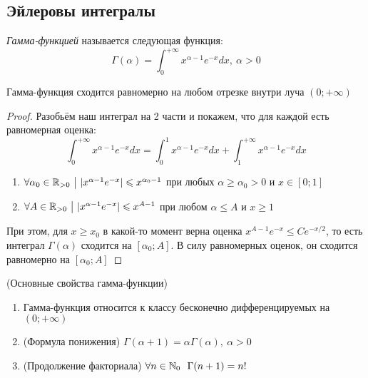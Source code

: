 \subsection{Эйлеровы интегралы}

\begin{definition}
	\textit{Гамма-функцией} называется следующая функция:
	\[
		\Gamma(\alpha) = \int_0^{+\infty} x^{\alpha - 1}e^{-x}dx,\ \alpha > 0
	\]
\end{definition}

\begin{proposition}
	Гамма-функция сходится равномерно на любом отрезке внутри луча $(0; +\infty)$
\end{proposition}

\begin{proof}
	Разобьём наш интеграл на 2 части и покажем, что для каждой есть равномерная оценка:
	\[
		\int_0^{+\infty} x^{\alpha - 1}e^{-x}dx = \int_0^1 x^{\alpha - 1}e^{-x}dx + \int_1^{+\infty} x^{\alpha - 1}e^{-x}dx
	\]
	\begin{enumerate}
		\item $\forall \alpha_0 \in \mathbb{R}_{> 0} \ \big|\  |x^{\alpha - 1}e^{-x}| \leqslant x^{\alpha_0 - 1}$ при любых $\alpha \ge \alpha_0 > 0$ и $x \in [0; 1]$
		
		\item $\forall A \in \mathbb{R}_{> 0} \ \big|\  |x^{\alpha - 1}e^{-x}| \leqslant x^{A - 1}$ при любом $\alpha \le A$ и $x \ge 1$
	\end{enumerate}
	При этом, для $x \ge x_0$ в какой-то момент верна оценка $x^{A - 1}e^{-x} \le Ce^{-x / 2}$, то есть интеграл $\Gamma(\alpha)$ сходится на $[\alpha_0; A]$. В силу равномерных оценок, он сходится равномерно на $[\alpha_0; A]$
\end{proof}

\begin{theorem} (Основные свойства гамма-функции)
	\begin{enumerate}
		\item Гамма-функция относится к классу бесконечно дифференцируемых на $(0; +\infty)$
		
		\item (Формула понижения) $\Gamma(\alpha + 1) = \alpha\Gamma(\alpha),\ \alpha > 0$
		
		\item (Продолжение факториала) $\forall n \in \mathbb{N}_0\ \ \Gamma(n + 1) = n!$
	\end{enumerate}
\end{theorem}

